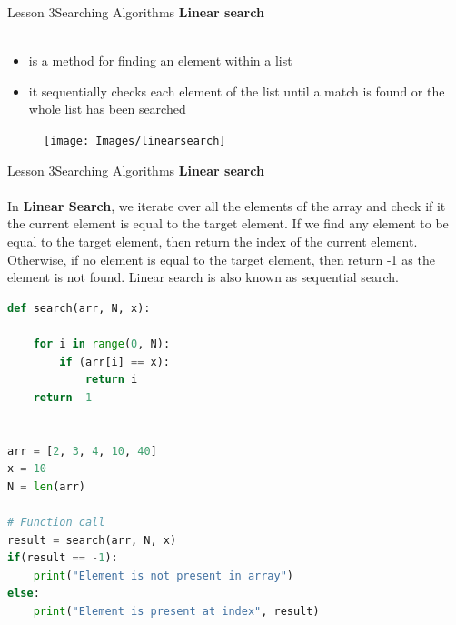 \documentclass[aspectratio=1610]{beamer}
\begin{document}

\begin{frame}{Lesson 3}{Searching Algorithms}
\LARGE
\textbf{Linear search}\\~\\
\begin{minipage}{0.65\textwidth}
\Large
\begin{itemize}
    \item is a method for finding an element within a list
    \item it sequentially checks each element of the list until a match is found or the whole list has been searched
 \end{itemize}
  \end{minipage}
\begin{minipage}{.0\textwidth}
      \begin{figure}
        \texttt{[image: Images/linearsearch]}
      \end{figure}
  \end{minipage}  
\end{frame}



\begin{frame}{Lesson 3}{Searching Algorithms}
\LARGE
\textbf{Linear search}\\~\\
In \textbf{Linear Search}, we iterate over all the elements of the array and check if it 
the current element is equal to the target element. If we find any element to be equal to 
the target element, then return the index of the current element. Otherwise, if no element 
is equal to the target element, then return -1 as the element is not found. Linear search
is also known as sequential search.
\end{frame}


\begin{frame}[fragile]
\begin{lstlisting}[language=Python]
def search(arr, N, x):

    for i in range(0, N):
        if (arr[i] == x):
            return i
    return -1


arr = [2, 3, 4, 10, 40]
x = 10
N = len(arr)

# Function call
result = search(arr, N, x)
if(result == -1):
    print("Element is not present in array")
else:
    print("Element is present at index", result)

\end{lstlisting}
\end{frame}
\end{document}
